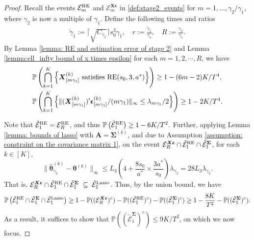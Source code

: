 \documentclass[aos,preprint]{imsart}
\theoremstyle{plain}
\theoremstyle{definition}
\newcommand{\btheta}{\boldsymbol{\theta}}
\newcommand{\bd}[1]{\boldsymbol{#1}}
\newcommand{\hbtheta}{\widehat{\boldsymbol{\theta}}}
\newcommand{\bX}{\boldsymbol{X}}
\newcommand{\bSigma}{\boldsymbol{\Sigma}}
\newcommand{\bA}{\boldsymbol{A}}
\newcommand{\tgamma}{\widetilde{\gamma}}
\newcommand{\mE}{\mathcal{E}}
\newcommand{\bepsilon}{\bd{\epsilon}}
\newcommand{\Pro}{\mathbb{P}}
\begin{document}
\begin{appendix}
\begin{proof}
Recall the events $\mE_m^{\textup{RE}}$ and $\mE_m^{\bX\bepsilon}$ in \eqref{def:stage2_events} for $m = 1,\ldots,\gamma_2/\gamma_1$, where $\gamma_2$ is now a multiple of $\gamma_1$. Define the following times and ratios
\begin{align}\label{aux:times_ratios}
    \tgamma_1 := \lceil \sqrt{C_{\gamma_2}} \rceil s_0^3\gamma_1, \quad r := \frac{\tgamma_1}{\gamma_1}, \quad R:= \frac{\gamma_2}{\gamma_1}.
\end{align}
By Lemma \ref{lemma: RE and estimation error of stage 2} and 
Lemma \ref{lemma:ell_infty bound of x times epsilon}
for each $m=1,2,\cdots, R$,   we have
\begin{align}\label{aux:from_stage2}
\begin{split}
&\Pro\left(\bigcap_{k = 1}^{K}\left\{\bX_{[m\gamma_1]}^{(k)} \textup{ satisfies } \textup{RE}(s_0,3,a^*) \right\}\right) \ge 1-(6m-2)K/T^4,\\
&\Pro\left(\bigcap_{k = 1}^{K}\left\{\|(\bX_{[m\gamma_1]}^{(k)})'\bepsilon_{[m\gamma_1]}^{(k)}/(m\gamma_1)\|_{\infty} \leq \lambda_{m\gamma_1}/2\right\}\right)\ge 1-2K/T^4.
\end{split}
\end{align}



Note that $\tilde{\mE}_1^{\textup{RE}} = \mE_{R}^{\textup{RE}}$, and thus $ \Pro\left(\tilde{\mE}_1^{\textup{RE}}\right) \geq 1 - 6K/T^2.$ Further, applying Lemma \ref{lemma: bounds of lasso}
with $\bA = \bSigma^{(k)}$, and due to Assumption \ref{assumption: constraint on the covariance matrix 1}, on the event $\mE_{R}^{\bX\bepsilon}  \cap \tilde{\mE}_1^{\textup{RE}} \cap \tilde{\mE}_1^{\bSigma}$, for each $k \in [K]$,
$$
\|\hbtheta_{\gamma_2}^{(k)} - \btheta^{(k)}\|_{\infty} \leq L_3\left(4 + \frac{8s_0}{a^*}  \times \frac{3a^*}{s_0}  \right) \lambda_{\gamma_2} = 28 L_3 \lambda_{\gamma_2}.
$$
That is, $\mE_{R}^{\bX\bepsilon} \cap \tilde{\mE}_1^{\textup{RE}} \cap \tilde{\mE}_1^{\bSigma}\; \subseteq \;  \tilde{\mE}_1^{\textup{Lasso}}$.
Thus, by the union bound, we have
\begin{align*}
   \Pro\left( \tilde{\mE}_1^{\textup{RE}} \cap \tilde{\mE}_1^{\bSigma} \cap  \tilde{\mE}_1^{\textup{Lasso}}\right) \geq 1 - \Pro((\mE_{R}^{\bX\bepsilon})^c) - \Pro((\tilde{\mE}_1^{\textup{RE}})^c) - \Pro((\tilde{\mE}_1^{\bSigma})^c) \geq 1 - \frac{8K}{T^2} - \Pro((\tilde{\mE}_1^{\bSigma})^c).
\end{align*}
As a result, it suffices to show that $\Pro((\tilde{\mE}_1^{\bSigma})^c) \leq 9K/T^2$, on which we now focus.


\end{proof}
\end{appendix}
\end{document}
